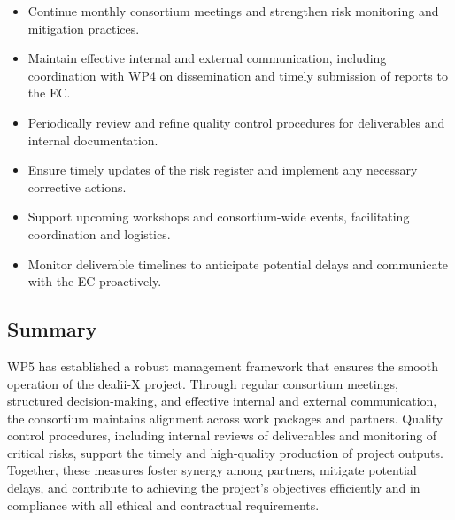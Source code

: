 \documentclass[a4paper,12pt, numbers]{article}
\begin{document}
\begin{itemize}[left=1em, itemsep=0pt, topsep=0pt]
\item Continue monthly consortium meetings and strengthen risk monitoring and mitigation practices.
\item Maintain effective internal and external communication, including coordination with WP4 on dissemination and timely submission of reports to the EC.
\item Periodically review and refine quality control procedures for deliverables and internal documentation.
\item Ensure timely updates of the risk register and implement any necessary corrective actions.
\item Support upcoming workshops and consortium-wide events, facilitating coordination and logistics.
\item Monitor deliverable timelines to anticipate potential delays and communicate with the EC proactively.
\end{itemize}

\subsection{Summary}  

WP5 has established a robust management framework that ensures the smooth operation of the dealii-X project. Through regular consortium meetings, structured decision-making, and effective internal and external communication, the consortium maintains alignment across work packages and partners. Quality control procedures, including internal reviews of deliverables and monitoring of critical risks, support the timely and high-quality production of project outputs. Together, these measures foster synergy among partners, mitigate potential delays, and contribute to achieving the project’s objectives efficiently and in compliance with all ethical and contractual requirements.





\label{MyLastPage}
\end{document}

